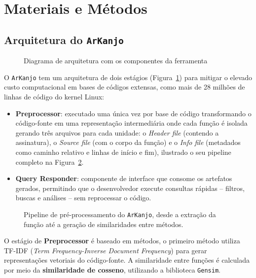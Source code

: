 \documentclass[twocolumn]{article}
\begin{document}
\section{Materiais e Métodos}

\subsection{Arquitetura do \texttt{\bfseries ArKanjo}}

\begin{figure}[ht]
    \centering
    \caption{Diagrama de arquitetura com os componentes da ferramenta}
    \label{fig:architecture-arkanjo}
\end{figure}

O \texttt{ArKanjo} tem um arquitetura de dois estágios (Figura~\ref{fig:architecture-arkanjo}) para mitigar o elevado custo computacional em bases de códigos extensas, como mais de 28 milhões de linhas de código do kernel Linux:

\begin{itemize}
    \item \textbf{Preprocessor}: executado uma única vez por base de código transformando o código-fonte em uma representação intermediária onde cada função é isolada gerando três arquivos para cada unidade: o \textit{Header file} (contendo a assinatura), o \textit{Source file} (com o corpo da função) e o \textit{Info file} (metadados como caminho relativo e linhas de início e fim), ilustrado o seu pipeline completo na Figura~\ref{fig:pipeline-arkanjo}.

    \item \textbf{Query Responder}: componente de interface que consome os artefatos gerados, permitindo que o desenvolvedor execute consultas rápidas -- filtros, buscas e análises -- sem reprocessar o código.
\end{itemize}

\begin{figure}[ht]
    \centering
    \caption{Pipeline de pré-processamento do \texttt{ArKanjo}, desde a extração da função até a geração de similaridades entre métodos.}
    \label{fig:pipeline-arkanjo}
\end{figure}

O estágio de \textbf{Preprocessor} é baseado em métodos, o primeiro método utiliza TF-IDF (\textit{Term Frequency-Inverse Document Frequency}) para gerar representações vetoriais do código-fonte. A similaridade entre funções é calculada por meio da \textbf{similaridade de cosseno}, utilizando a biblioteca \texttt{Gensim}.
\end{document}
